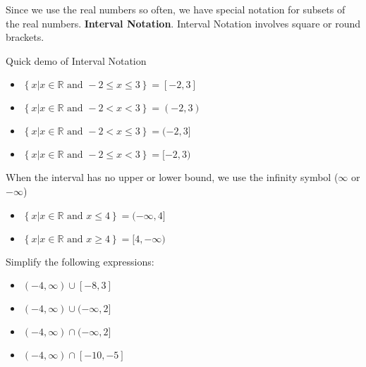 \begin{notation}
  Since we use the real numbers so often, we have special notation for subsets
  of the real numbers. \textbf{Interval Notation}. Interval Notation involves
  square or round brackets.
\end{notation}

\begin{example}
  \label{exm:interval_notation}

  Quick demo of Interval Notation

  \begin{itemize}
    \label{item:interval_notation}

    \item $\left\{x | x \in \mathbb{R} \textrm{ and } -2 \le x \le 3\right\}
      = [-2, 3]$
    \item $\left\{x | x \in \mathbb{R} \textrm{ and } -2 < x < 3\right\}
      = (-2, 3)$
    \item $\left\{x | x \in \mathbb{R} \textrm{ and } -2 < x \le 3\right\}
      = (-2, 3]$
    \item $\left\{x | x \in \mathbb{R} \textrm{ and } -2 \le x < 3\right\}
      = [-2, 3)$
  \end{itemize}

  When the interval has no upper or lower bound, we use the infinity symbol
  ($\infty$ or $-\infty$)

  \begin{itemize}
    \label{item:interval_notation_with_no_upper_or_lower_bound}

    \item $\left\{x | x \in \mathbb{R} \textrm{ and } x \le 4\right\} =
      (-\infty, 4]$
    \item $\left\{x | x \in \mathbb{R} \textrm{ and } x \ge 4\right\} =
      [4, -\infty)$
  \end{itemize}
\end{example}

\begin{exc}
  \label{exc:simplify_the_following_expressions}

  Simplify the following expressions:
  
  \begin{itemize}
    \label{item:simplify_the_following_expressions}

    \item $(-4, \infty) \cup [-8, 3]$
    \item $(-4, \infty) \cup (-\infty, 2]$
    \item $(-4, \infty) \cap (-\infty, 2]$
    \item $(-4, \infty) \cap [-10, -5]$
  \end{itemize}
\end{exc}

\newpage
